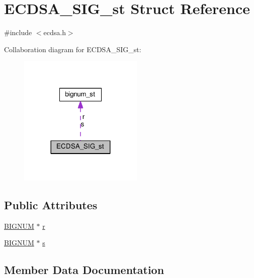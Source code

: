 \hypertarget{struct_e_c_d_s_a___s_i_g__st}{}\section{E\+C\+D\+S\+A\+\_\+\+S\+I\+G\+\_\+st Struct Reference}
\label{struct_e_c_d_s_a___s_i_g__st}


{\ttfamily \#include $<$ecdsa.\+h$>$}



Collaboration diagram for E\+C\+D\+S\+A\+\_\+\+S\+I\+G\+\_\+st\+:
\nopagebreak
\begin{figure}[H]
\begin{center}
\leavevmode
\includegraphics[width=168pt]{struct_e_c_d_s_a___s_i_g__st__coll__graph}
\end{center}
\end{figure}
\subsection*{Public Attributes}
\begin{DoxyCompactItemize}
\item 
\hyperlink{ossl__typ_8h_a6fb19728907ec6515e4bfb716bffa141}{B\+I\+G\+N\+UM} $\ast$ \hyperlink{struct_e_c_d_s_a___s_i_g__st_aa4a144f7356b7e62243af763e584fd0f}{r}
\item 
\hyperlink{ossl__typ_8h_a6fb19728907ec6515e4bfb716bffa141}{B\+I\+G\+N\+UM} $\ast$ \hyperlink{struct_e_c_d_s_a___s_i_g__st_a784f9869eb36cd84ea750b3ac58075ca}{s}
\end{DoxyCompactItemize}


\subsection{Member Data Documentation}
